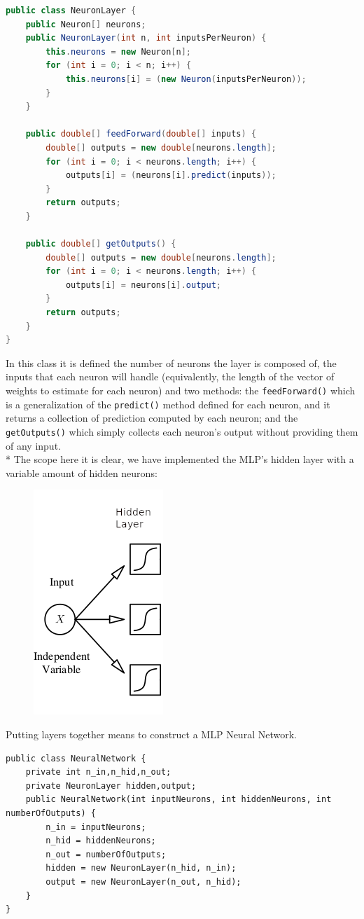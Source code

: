 \documentclass[10pt,a4paper]{article}
\begin{document}
\begin{lstlisting}[language=Java]
public class NeuronLayer {
	public Neuron[] neurons;
	public NeuronLayer(int n, int inputsPerNeuron) {
		this.neurons = new Neuron[n];
		for (int i = 0; i < n; i++) {
			this.neurons[i] = (new Neuron(inputsPerNeuron));
		}
	}
	
	public double[] feedForward(double[] inputs) {
		double[] outputs = new double[neurons.length];
		for (int i = 0; i < neurons.length; i++) {
			outputs[i] = (neurons[i].predict(inputs));
		}
		return outputs;
	}
	
	public double[] getOutputs() {
		double[] outputs = new double[neurons.length];
		for (int i = 0; i < neurons.length; i++) {
			outputs[i] = neurons[i].output;
		}
		return outputs;
	}
}
\end{lstlisting}
In this class it is defined the number of neurons the layer is composed of, the inputs that each neuron will handle (equivalently, the length of the vector of weights to estimate for each neuron) and two methods: the \texttt{feedForward()} which is a generalization of the \texttt{predict()} method defined for each neuron, and it returns a collection of prediction computed by each neuron; and the \texttt{getOutputs()} which simply collects each neuron's output without providing them of any input.\\* The scope here it is clear, we have implemented the MLP's hidden layer with a variable amount of hidden neurons:
\begin{figure}[h!]
	\centering
	\includegraphics[scale=1.5]{img/hiddenlayer}
	\label{fig:hiddenlayer}
\end{figure}\newpage\noindent
Putting layers together means to construct a MLP Neural Network.
\begin{lstlisting}
public class NeuralNetwork {
	private int n_in,n_hid,n_out;
	private NeuronLayer hidden,output;
	public NeuralNetwork(int inputNeurons, int hiddenNeurons, int numberOfOutputs) {
		n_in = inputNeurons;
		n_hid = hiddenNeurons;
		n_out = numberOfOutputs;
		hidden = new NeuronLayer(n_hid, n_in);
		output = new NeuronLayer(n_out, n_hid);
	}
}
\end{lstlisting}
\end{document}
